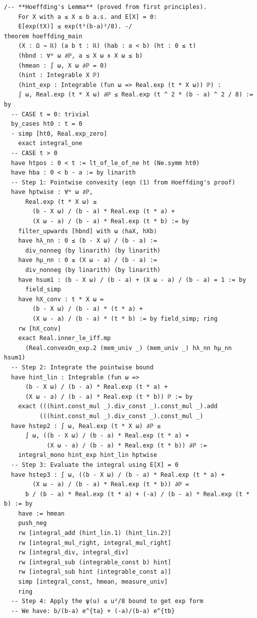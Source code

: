\documentclass[11pt,a4paper]{article}
\theoremstyle{definition}
\theoremstyle{plain}
\theoremstyle{remark}
\begin{document}
\begin{leanblock}
\begin{lstlisting}
/-- **Hoeffding's Lemma** (proved from first principles).
    For X with a ≤ X ≤ b a.s. and E[X] = 0:
    E[exp(tX)] ≤ exp(t²(b-a)²/8). -/
theorem hoeffding_main
    (X : Ω → ℝ) (a b t : ℝ) (hab : a < b) (ht : 0 ≤ t)
    (hbnd : ∀ᵐ ω ∂ℙ, a ≤ X ω ∧ X ω ≤ b)
    (hmean : ∫ ω, X ω ∂ℙ = 0)
    (hint : Integrable X ℙ)
    (hint_exp : Integrable (fun ω => Real.exp (t * X ω)) ℙ) :
    ∫ ω, Real.exp (t * X ω) ∂ℙ ≤ Real.exp (t ^ 2 * (b - a) ^ 2 / 8) := by
  -- CASE t = 0: trivial
  by_cases ht0 : t = 0
  · simp [ht0, Real.exp_zero]
    exact integral_one
  -- CASE t > 0
  have htpos : 0 < t := lt_of_le_of_ne ht (Ne.symm ht0)
  have hba : 0 < b - a := by linarith
  -- Step 1: Pointwise convexity (eqn (1) from Hoeffding's proof)
  have hptwise : ∀ᵐ ω ∂ℙ,
      Real.exp (t * X ω) ≤
        (b - X ω) / (b - a) * Real.exp (t * a) +
        (X ω - a) / (b - a) * Real.exp (t * b) := by
    filter_upwards [hbnd] with ω ⟨haX, hXb⟩
    have hλ_nn : 0 ≤ (b - X ω) / (b - a) :=
      div_nonneg (by linarith) (by linarith)
    have hμ_nn : 0 ≤ (X ω - a) / (b - a) :=
      div_nonneg (by linarith) (by linarith)
    have hsum1 : (b - X ω) / (b - a) + (X ω - a) / (b - a) = 1 := by
      field_simp
    have hX_conv : t * X ω =
        (b - X ω) / (b - a) * (t * a) +
        (X ω - a) / (b - a) * (t * b) := by field_simp; ring
    rw [hX_conv]
    exact Real.inner_le_iff.mp
      (Real.convexOn_exp.2 (mem_univ _) (mem_univ _) hλ_nn hμ_nn hsum1)
  -- Step 2: Integrate the pointwise bound
  have hint_lin : Integrable (fun ω =>
      (b - X ω) / (b - a) * Real.exp (t * a) +
      (X ω - a) / (b - a) * Real.exp (t * b)) ℙ := by
    exact (((hint.const_mul _).div_const _).const_mul _).add
          (((hint.const_mul _).div_const _).const_mul _)
  have hstep2 : ∫ ω, Real.exp (t * X ω) ∂ℙ ≤
      ∫ ω, ((b - X ω) / (b - a) * Real.exp (t * a) +
            (X ω - a) / (b - a) * Real.exp (t * b)) ∂ℙ :=
    integral_mono hint_exp hint_lin hptwise
  -- Step 3: Evaluate the integral using E[X] = 0
  have hstep3 : ∫ ω, ((b - X ω) / (b - a) * Real.exp (t * a) +
        (X ω - a) / (b - a) * Real.exp (t * b)) ∂ℙ =
      b / (b - a) * Real.exp (t * a) + (-a) / (b - a) * Real.exp (t * b) := by
    have := hmean
    push_neg
    rw [integral_add (hint_lin.1) (hint_lin.2)]
    rw [integral_mul_right, integral_mul_right]
    rw [integral_div, integral_div]
    rw [integral_sub (integrable_const b) hint]
    rw [integral_sub hint (integrable_const a)]
    simp [integral_const, hmean, measure_univ]
    ring
  -- Step 4: Apply the ψ(u) ≤ u²/8 bound to get exp form
  -- We have: b/(b-a) e^{ta} + (-a)/(b-a) e^{tb}

\end{lstlisting}
\end{leanblock}
\end{document}

